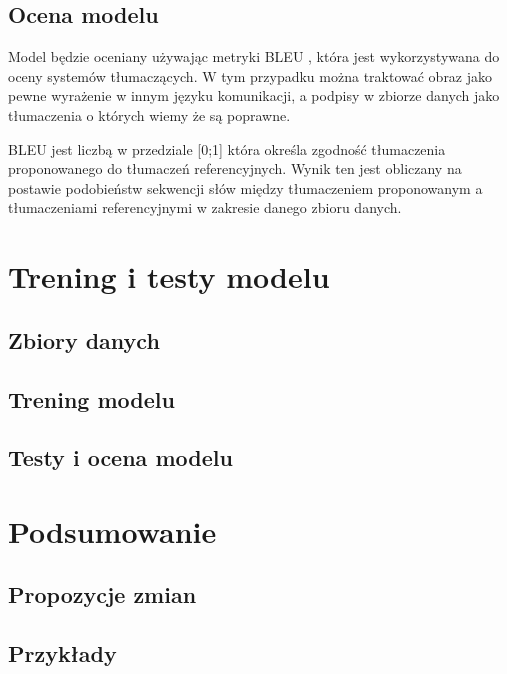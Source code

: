 \subsection{Ocena modelu}
Model będzie oceniany używając metryki BLEU \cite{BLEU}, która jest wykorzystywana do oceny systemów tłumaczących. W tym przypadku można traktować
obraz jako pewne wyrażenie w innym języku komunikacji, a podpisy w zbiorze danych jako tłumaczenia o których wiemy że są poprawne.

BLEU jest liczbą w przedziale [0;1] która określa zgodność tłumaczenia proponowanego do tłumaczeń referencyjnych.
Wynik ten jest obliczany na postawie podobieństw sekwencji słów między tłumaczeniem proponowanym a tłumaczeniami referencyjnymi w zakresie danego zbioru danych.


\section{Trening i testy modelu}
\subsection{Zbiory danych}

\subsection{Trening modelu}
\subsection{Testy i ocena modelu}
\section{Podsumowanie}
\subsection{Propozycje zmian}
\subsection{Przykłady}
\newpage

